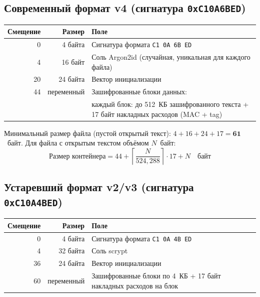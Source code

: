 \documentclass[12pt,a4paper]{article}
\begin{document}
\subsection{Современный формат v4 (сигнатура \texttt{0xC10A6BED})}

\begin{center}
\begin{tabularx}{\textwidth}{rrX}
    \toprule
    \textbf{Смещение} & \textbf{Размер} & \textbf{Поле} \\
    \midrule
    0   & 4 байта   & Сигнатура формата \texttt{C1 0A 6B ED} \\
    4   & 16 байт   & Соль Argon2id (случайная, уникальная для каждого файла) \\
    20  & 24 байта  & Вектор инициализации \\
    44  & переменный & Зашифрованные блоки данных: \\
        &           & \quad каждый блок: до 512~КБ зашифрованного текста + 17 байт накладных расходов (MAC + tag) \\
    \bottomrule
\end{tabularx}
\end{center}

Минимальный размер файла (пустой открытый текст): $4 + 16 + 24 + 17 = \mathbf{61}$~байт.
Для файла с открытым текстом объёмом $N$~байт:
$$\text{Размер контейнера} = 44 + \left\lceil \frac{N}{524{,}288} \right\rceil \cdot 17 + N \quad \text{байт}$$

\newpage
\subsection{Устаревший формат v2/v3 (сигнатура \texttt{0xC10A4BED})}

\begin{center}
\begin{tabularx}{\textwidth}{rrX}
    \toprule
    \textbf{Смещение} & \textbf{Размер} & \textbf{Поле} \\
    \midrule
    0   & 4 байта   & Сигнатура формата \texttt{C1 0A 4B ED} \\
    4   & 32 байта   & Соль scrypt \\
    36  & 24 байта  & Вектор инициализации \\
    60  & переменный & Зашифрованные блоки по 4~КБ + 17 байт накладных расходов на блок \\
    \bottomrule
\end{tabularx}
\end{center}
\end{document}
